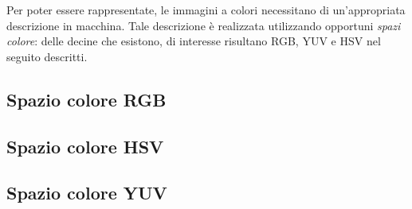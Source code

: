 \documentclass{subfiles}
\begin{document}
Per poter essere rappresentate, le immagini a colori necessitano di un'appropriata descrizione in macchina.
Tale descrizione è realizzata utilizzando opportuni \emph{spazi colore}: delle decine che esistono, di interesse risultano RGB, YUV e HSV nel seguito descritti.

\subsection{Spazio colore RGB}


\subsection{Spazio colore HSV}


\subsection{Spazio colore YUV}

\end{document}
